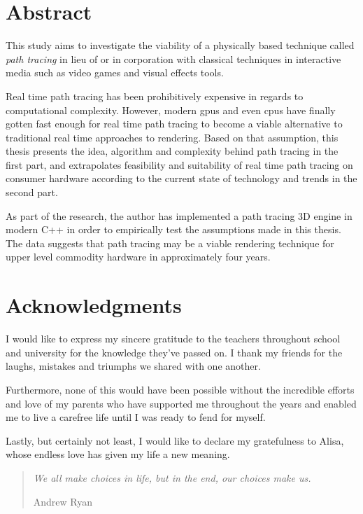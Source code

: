 \documentclass[
  twoside,
  11pt, a4paper,
  footinclude=true,
  headinclude=true,
  cleardoublepage=empty
]{scrreprt}
\begin{document}


\chapter*{Abstract}
\onehalfspace
This study aims to investigate the viability of a physically based technique called
\emph{path tracing} in lieu of or in corporation with classical techniques in interactive media
such as video games and visual effects tools.

Real time path tracing has been prohibitively expensive in regards to computational complexity.
However, modern \acs{gpu}s and even \acs{cpu}s have finally gotten fast enough for real time path
tracing to become a viable alternative to traditional real time approaches to rendering.  Based on
that assumption, this thesis presents the idea, algorithm and complexity behind path tracing in the
first part, and extrapolates feasibility and suitability of real time path tracing on consumer
hardware according to the current state of technology and trends in the second part.

As part of the research, the author has implemented a path tracing 3D engine in modern C++ in order
to empirically test the assumptions made in this thesis. The data suggests that path tracing may be a
viable rendering technique for upper level commodity hardware in approximately four years.
\singlespace

\chapter*{Acknowledgments}
\doublespacing
I would like to express my sincere gratitude to the teachers throughout school and university for
the knowledge they've passed on.
I thank my friends for the laughs, mistakes and triumphs we shared with one another.

Furthermore, none of this would have been possible without the incredible efforts and love of my
parents who have supported me throughout the years and enabled me to live a carefree life until I
was ready to fend for myself.

Lastly, but certainly not least, I would like to declare my gratefulness to Alisa, whose endless love
has given my life a new meaning.

\singlespace

\clearpage
\vspace*{\fill}
\thispagestyle{empty} %
\begin{quotation}
    \em
    We all make choices in life, but in the end, our choices make us.

    \medskip
    \raggedleft
    Andrew Ryan
\end{quotation}
\vspace*{\fill}
\end{document}
